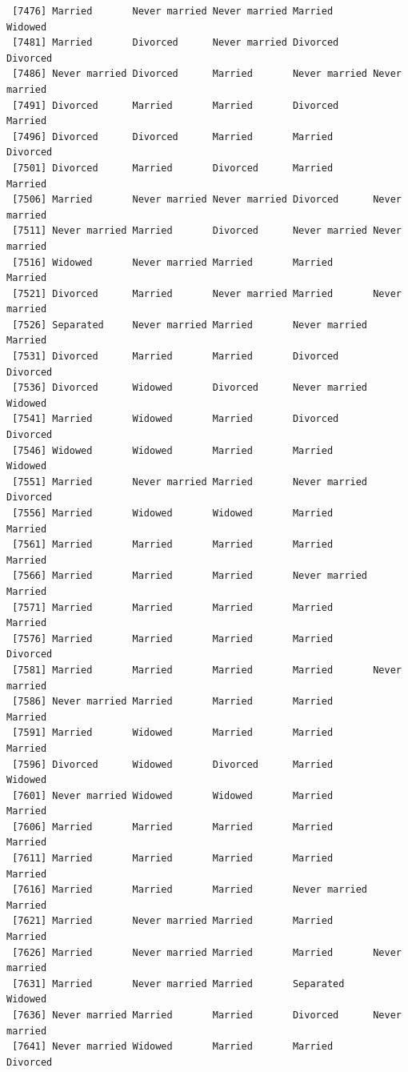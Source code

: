 \documentclass[
  letterpaper,
  DIV=11,
  numbers=noendperiod,
  oneside]{scrartcl}
\begin{document}
\begin{verbatim}
 [7476] Married       Never married Never married Married       Widowed      
 [7481] Married       Divorced      Never married Divorced      Divorced     
 [7486] Never married Divorced      Married       Never married Never married
 [7491] Divorced      Married       Married       Divorced      Married      
 [7496] Divorced      Divorced      Married       Married       Divorced     
 [7501] Divorced      Married       Divorced      Married       Married      
 [7506] Married       Never married Never married Divorced      Never married
 [7511] Never married Married       Divorced      Never married Never married
 [7516] Widowed       Never married Married       Married       Married      
 [7521] Divorced      Married       Never married Married       Never married
 [7526] Separated     Never married Married       Never married Married      
 [7531] Divorced      Married       Married       Divorced      Divorced     
 [7536] Divorced      Widowed       Divorced      Never married Widowed      
 [7541] Married       Widowed       Married       Divorced      Divorced     
 [7546] Widowed       Widowed       Married       Married       Widowed      
 [7551] Married       Never married Married       Never married Divorced     
 [7556] Married       Widowed       Widowed       Married       Married      
 [7561] Married       Married       Married       Married       Married      
 [7566] Married       Married       Married       Never married Married      
 [7571] Married       Married       Married       Married       Married      
 [7576] Married       Married       Married       Married       Divorced     
 [7581] Married       Married       Married       Married       Never married
 [7586] Never married Married       Married       Married       Married      
 [7591] Married       Widowed       Married       Married       Married      
 [7596] Divorced      Widowed       Divorced      Married       Widowed      
 [7601] Never married Widowed       Widowed       Married       Married      
 [7606] Married       Married       Married       Married       Married      
 [7611] Married       Married       Married       Married       Married      
 [7616] Married       Married       Married       Never married Married      
 [7621] Married       Never married Married       Married       Married      
 [7626] Married       Never married Married       Married       Never married
 [7631] Married       Never married Married       Separated     Widowed      
 [7636] Never married Married       Married       Divorced      Never married
 [7641] Never married Widowed       Married       Married       Divorced     

\end{verbatim}
\end{document}

